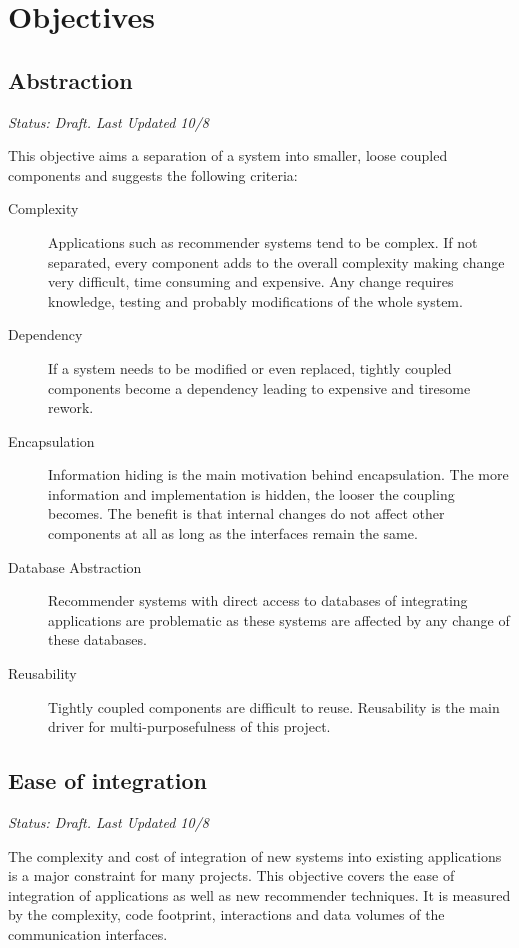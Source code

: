\section{Objectives}

\subsection{Abstraction}
\label{intro-objectives-abstraction}

\emph{Status: Draft. Last Updated 10/8}

This objective aims a separation of a system into smaller, loose coupled components and suggests the following criteria:

\begin{description}
    \item[Complexity] Applications such as recommender systems tend to be complex. If not separated, every component adds to the overall complexity making change very difficult, time consuming and expensive. Any change requires knowledge, testing and probably modifications of the whole system.
    \item[Dependency] If a system needs to be modified or even replaced, tightly coupled components become a dependency leading to expensive and tiresome rework.
    \item[Encapsulation] Information hiding is the main motivation behind encapsulation. The more information and implementation is hidden, the looser the coupling becomes. The benefit is that internal changes do not affect other components at all as long as the interfaces remain the same.
    \item[Database Abstraction] Recommender systems with direct access to databases of integrating applications are problematic as these systems are affected by any change of these databases.
    \item[Reusability] Tightly coupled components are difficult to reuse. Reusability is the main driver for multi-purposefulness of this project.
\end{description}

\subsection{Ease of integration}
\label{intro-objectives-easeofintegration}

\emph{Status: Draft. Last Updated 10/8}

The complexity and cost of integration of new systems into existing applications is a major constraint for many projects. This objective covers the ease of integration of applications as well as new recommender techniques. It is measured by the complexity, code footprint, interactions and data volumes of the communication interfaces.


